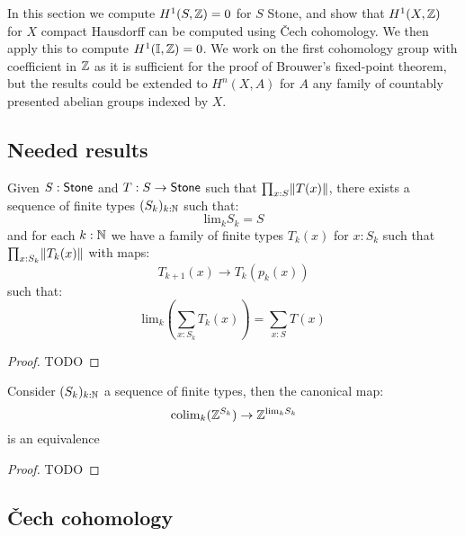 In this section we compute $H^1(S,\mathbb{Z}) = 0$ for $S$ Stone, and show that $H^1(X,\mathbb{Z})$ for $X$ compact Hausdorff can be computed using \v{C}ech cohomology. We then apply this to compute $H^1(\mathbb{I},\mathbb{Z})=0$. We work on the first cohomology group with coefficient in $\mathbb{Z}$ as it is sufficient for the proof of Brouwer's fixed-point theorem, but the results could be extended to $H^n(X,A)$ for $A$ any family of countably presented abelian groups indexed by $X$.

\subsection{Needed results}


\begin{lemma}\label{finite-approximation-surjection-stone}
Given $S:\mathsf{Stone}$ and $T:S\to\mathsf{Stone}$ such that $\prod_{x:S}\lVert T(x) \rVert$, there exists a sequence of finite types $(S_k)_{k:\mathbb{N}}$
such that: 
\[\mathrm{lim}_kS_k = S\] 
and for each $k:\mathbb{N}$ we have a family of finite types $T_k(x)$ for $x:S_k$ such that $\prod_{x:S_k}\lVert T_k(x) \rVert$ with maps:
\[T_{k+1}(x) \to T_k(p_k(x))\]
such that:
\[\mathrm{lim}_k\left(\sum_{x:S_k}T_k(x)\right) = \sum_{x:S}T(x)\]
\end{lemma}

\begin{proof}
TODO
\end{proof}

\begin{lemma}\label{scott-continuity}
Consider $(S_k)_{k:\mathbb{N}}$ a sequence of finite types, then the canonical map:
\[\mathrm{colim}_k(\mathbb{Z}^{S_k}) \to \mathbb{Z}^{\mathrm{lim}_kS_k}\] 
is an equivalence
\end{lemma}

\begin{proof}
TODO
\end{proof}


\subsection{\v{C}ech cohomology}

